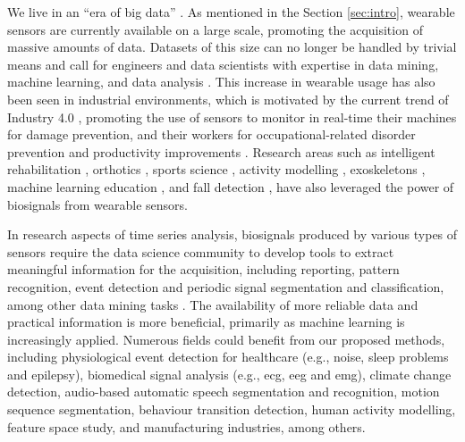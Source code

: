 We live in an ``era of big data'' \cite{chen2014big}.
As mentioned in the Section \ref{sec:intro}, wearable sensors are currently available on a large scale, promoting the acquisition of massive amounts of data.
Datasets of this size can no longer be handled by trivial means and call for engineers and data scientists with expertise in data mining, machine learning, and data analysis \cite{weiner2017bremen}.
This increase in wearable usage has also been seen in industrial environments, which is motivated by the current trend of Industry 4.0 \cite{xu2018industry}, promoting the use of sensors to monitor in real-time their machines for damage prevention, and their workers for occupational-related disorder prevention and productivity improvements \cite{varandas_evaluation_2019,santos_explaining_2020}.
Research areas such as intelligent rehabilitation \cite{liu19realtime, patel2012review, bonato2005advances, sung2005wearable, chen2015wearable, jakob2018robotic}, orthotics \cite{zhou22orthoses, menz2021objective, zhou21ankle, mangukiya2017electromyography}, sports science \cite{li20gait, liu22activityduration, mendes2016sensor, ji2018real, howard2016survey, mcnab2011iphone, howard2016wireless, yuji2005mems, espinosa2015inertial, ohgi2002microcomputer}, activity modelling \cite{liu2021thesis, chen2012sensor, chen2013ontology, liu2021motionunits}, exoskeletons \cite{wege2007electromyography, ganesan2015development}, machine learning education \cite{hartmann2022interactive}, and fall detection \cite{chen2006wearable, nyan2008wearable, xue2021hmm}, have also leveraged the power of biosignals from wearable sensors.

In research aspects of time series analysis, biosignals produced by various types of sensors require the data science community to develop tools to extract meaningful information for the acquisition, including reporting, pattern recognition, event detection and periodic signal segmentation and classification, among other data mining tasks \cite{rodrigues2017noise, david_thesis}. The availability of more reliable data and practical information is more beneficial, primarily as machine learning is increasingly applied. Numerous fields could benefit from our proposed methods, including physiological event detection for healthcare (e.g., noise, sleep problems and epilepsy), biomedical signal analysis (e.g., \gls{ecg}, \gls{eeg} and \gls{emg}), climate change detection, audio-based automatic speech segmentation and recognition, motion sequence segmentation, behaviour transition detection, human activity modelling, feature space study, and manufacturing industries, among others.

